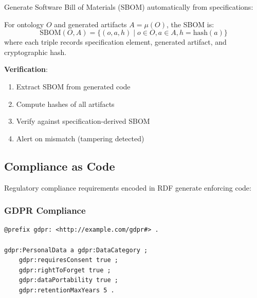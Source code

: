 Generate Software Bill of Materials (SBOM) automatically from specifications:

\begin{definition}
    For ontology $O$ and generated artifacts $A = \mu(O)$, the SBOM is:
    \begin{equation}
        \text{SBOM}(O, A) = \{(o, a, h) \mid o \in O, a \in A, h = \text{hash}(a)\}
    \end{equation}
    where each triple records specification element, generated artifact, and cryptographic hash.
\end{definition}

\textbf{Verification}:
\begin{enumerate}
    \item Extract SBOM from generated code
    \item Compute hashes of all artifacts
    \item Verify against specification-derived SBOM
    \item Alert on mismatch (tampering detected)
\end{enumerate}

\subsection{Compliance as Code}

Regulatory compliance requirements encoded in RDF generate enforcing code:

\subsubsection{GDPR Compliance}

\begin{verbatim}
@prefix gdpr: <http://example.com/gdpr#> .

gdpr:PersonalData a gdpr:DataCategory ;
    gdpr:requiresConsent true ;
    gdpr:rightToForget true ;
    gdpr:dataPortability true ;
    gdpr:retentionMaxYears 5 .
\end{verbatim}

